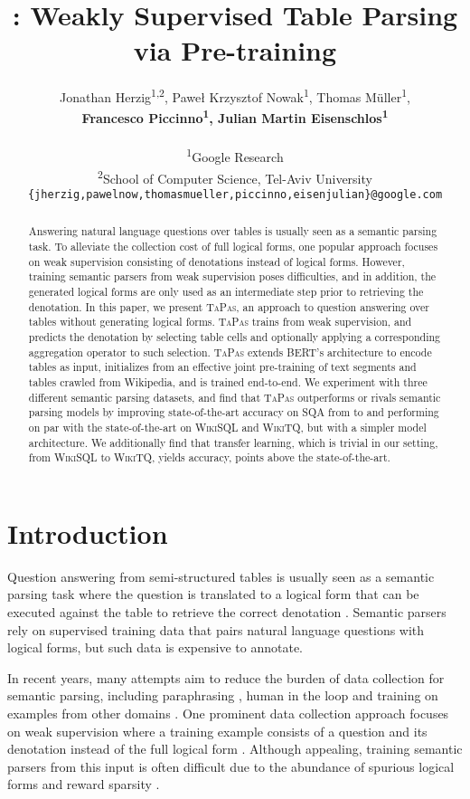 \documentclass[11pt,a4paper]{article}
\title{\ours : Weakly Supervised Table Parsing via Pre-training}
\author{Jonathan Herzig\textsuperscript{1,2}, Pawe\l{} Krzysztof Nowak\textsuperscript{1}, Thomas M{\"u}ller\textsuperscript{1},\\ \textbf{Francesco Piccinno\textsuperscript{1}, Julian Martin Eisenschlos\textsuperscript{1}} \\
\\
  \textsuperscript{1}Google Research \\
  \textsuperscript{2}School of Computer Science, Tel-Aviv University \\
  {\tt \{jherzig,pawelnow,thomasmueller,piccinno,eisenjulian\}@google.com} \\}
\date{}
\newcommand\sqa{\textsc{SQA}\xspace}
\newcommand\wikisql{\textsc{WikiSQL}\xspace}
\newcommand\wtq{\textsc{WikiTQ}\xspace}
\newcommand{\ours}{\textsc{TaPas}\xspace}
\begin{document}
\maketitle

\begin{abstract}
  Answering natural language questions over tables is usually seen as a semantic parsing task. 
To alleviate the collection cost of full logical forms,
one popular approach
focuses on
weak supervision consisting of denotations instead of logical forms. However, training semantic parsers from weak supervision poses difficulties, and in addition, the generated logical forms are only used as an intermediate step prior to retrieving the denotation.
In this paper, we present \ours, an approach to question answering over tables without generating logical forms. \ours trains from weak supervision, and predicts the denotation 
by selecting table cells and optionally applying a corresponding aggregation operator to such selection.
\ours extends BERT's architecture to encode tables as input, initializes from an effective joint pre-training of text segments and tables crawled from Wikipedia, and is trained end-to-end.   
We experiment with three different semantic parsing datasets, and find that \ours outperforms or rivals semantic parsing models by improving state-of-the-art accuracy on \sqa{} from  to  and performing on par with the state-of-the-art on \wikisql{} and \wtq{}, but with a simpler model architecture. We additionally find that transfer learning, which is trivial in our setting, from \wikisql{} to \wtq{}, yields  accuracy,  points above the state-of-the-art. \end{abstract}

\section{Introduction}

Question answering from semi-structured tables is usually seen as a semantic parsing task where the question is translated to a logical form that can
be executed against the table to retrieve the correct denotation \cite{pasupat2015compositional, zhong2017seq2sql, dasigi2019iterative, agarwal2019learning}. Semantic parsers rely on supervised training data that pairs natural language questions with logical forms, but such data is expensive to annotate. 

In recent years, many attempts aim to reduce the burden of data collection for semantic parsing, including paraphrasing \cite{wang2015overnight}, human in the loop \cite{iyer2017neural,lawrence-riezler-2018-improving} and training on examples from other domains \cite{herzig2017multi,su2017cross}.
One prominent data collection approach focuses on weak supervision where a training example consists of a question and its denotation instead of the full logical form \cite{clarke10world, liang11dcs, artzi2013weakly}. Although appealing, training semantic parsers from this input is often difficult due to the abundance of spurious logical forms \cite{berant2013freebase, guu2017bridging} and reward sparsity \cite{agarwal2019learning,muhlgay2019value}.
\end{document}
